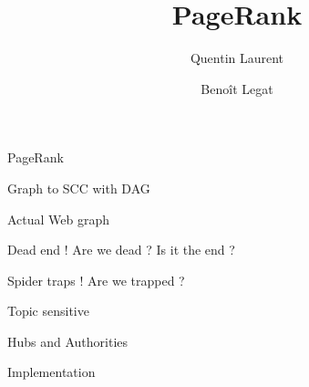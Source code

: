 \documentclass[10pt]{beamer}
\title{PageRank}
\author{
  Quentin Laurent
  \and
  Benoît Legat
}
\begin{document}
\begin{frame}
  \maketitle
\end{frame}

\begin{frame}{PageRank}
\end{frame}

\begin{frame}{Graph to SCC with DAG}
\end{frame}

\begin{frame}{Actual Web graph}
\end{frame}

\begin{frame}{Dead end ! Are we dead ? Is it the end ?}
\end{frame}

\begin{frame}{Spider traps ! Are we trapped ?}
\end{frame}

\begin{frame}{Topic sensitive}
\end{frame}

\begin{frame}{Hubs and Authorities}
\end{frame}

\begin{frame}{Implementation}
\end{frame}
\end{document}
